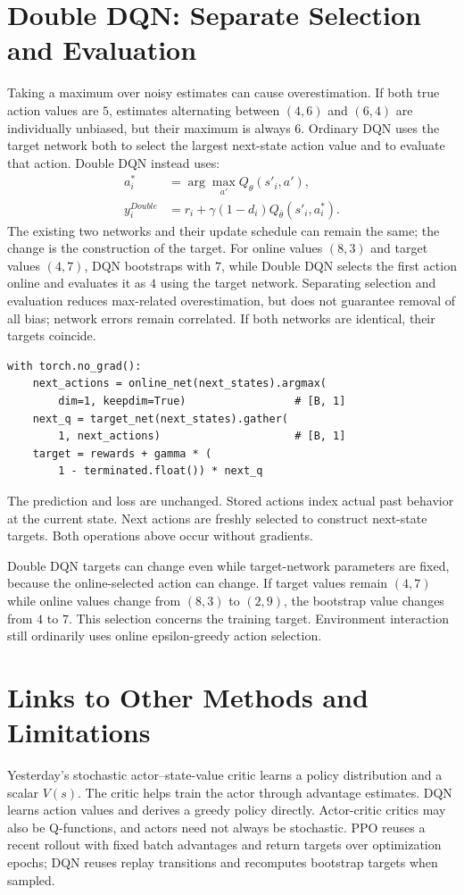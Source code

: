 \section{Double DQN: Separate Selection and Evaluation}
Taking a maximum over noisy estimates can cause overestimation.
If both true action values are $5$, estimates alternating between
$(4,6)$ and $(6,4)$ are individually unbiased, but their maximum
is always $6$.
Ordinary DQN uses the target network both to select the largest
next-state action value and to evaluate that action.
Double DQN instead uses:
\begin{align}
a_i^*&=\arg\max_{a'}Q_\theta(s'_i,a'),\\
y_i^{Double}&=r_i+\gamma(1-d_i)Q_{\bar\theta}(s'_i,a_i^*).
\end{align}
The existing two networks and their update schedule can remain the same;
the change is the construction of the target.
For online values $(8,3)$ and target values $(4,7)$, DQN bootstraps
with $7$, while Double DQN selects the first action online and evaluates
it as $4$ using the target network.
Separating selection and evaluation reduces max-related overestimation,
but does not guarantee removal of all bias; network errors remain correlated.
If both networks are identical, their targets coincide.

\begin{verbatim}
with torch.no_grad():
    next_actions = online_net(next_states).argmax(
        dim=1, keepdim=True)                 # [B, 1]
    next_q = target_net(next_states).gather(
        1, next_actions)                     # [B, 1]
    target = rewards + gamma * (
        1 - terminated.float()) * next_q
\end{verbatim}
The prediction and loss are unchanged.
Stored actions index actual past behavior at the current state.
Next actions are freshly selected to construct next-state targets.
Both operations above occur without gradients.

\begin{pitfall}
Double DQN targets can change even while target-network parameters
are fixed, because the online-selected action can change.
If target values remain $(4,7)$ while online values change from
$(8,3)$ to $(2,9)$, the bootstrap value changes from $4$ to $7$.
This selection concerns the training target. Environment interaction
still ordinarily uses online epsilon-greedy action selection.
\end{pitfall}

\section{Links to Other Methods and Limitations}
Yesterday's stochastic actor--state-value critic learns a policy
distribution and a scalar $V(s)$. The critic helps train the actor
through advantage estimates. DQN learns action values and derives
a greedy policy directly. Actor-critic critics may also be Q-functions,
and actors need not always be stochastic.
PPO reuses a recent rollout with fixed batch advantages and return
targets over optimization epochs; DQN reuses replay transitions
and recomputes bootstrap targets when sampled.

